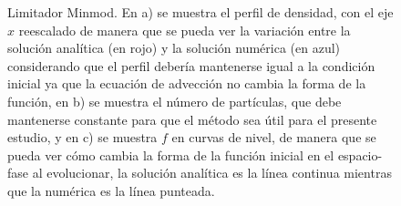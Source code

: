 \documentclass[11pt,twoside,openright,spanish]{report}
\numberwithin{equation}{chapter}
\numberwithin{figure}{chapter}
\numberwithin{table}{chapter}
\begin{document}
\begin{figure}[p]
	\caption{Limitador Minmod. En a) se muestra el perfil de densidad, con el eje $x$ reescalado de manera que se pueda ver la variación entre la solución analítica (en rojo) y la solución numérica (en azul) considerando que el perfil debería mantenerse igual a la condición inicial ya que la ecuación de advección no cambia la forma de la función, en b) se muestra el número de partículas, que debe mantenerse constante para que el método sea útil para el presente estudio, y en c) se muestra $f$ en curvas de nivel, de manera que se pueda ver cómo cambia la forma de la función inicial en el espacio-fase al evolucionar, la solución analítica es la línea continua mientras que la numérica es la línea punteada.}
	\label{minmod}
\end{figure}
\end{document}

